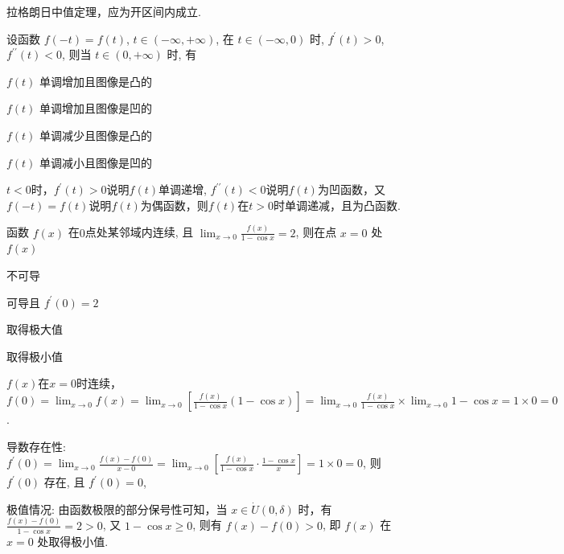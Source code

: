 \documentclass{CWNUExam}
\begin{document}
\begin{analysis}
  拉格朗日中值定理，应为开区间内成立.
\end{analysis}

\begin{problem}
  设函数 $f(-t)=f(t)$, $t \in\left(-\infty, +\infty\right)$, 在 $t \in(-\infty, 0)$ 时, $f^{\prime}(t)>0$, $f^{\prime\prime}(t)<0$, 则当 $t \in(0, +\infty)$ 时, 有
  \paren[C]
  \begin{choices}
    \item $f(t)$ 单调增加且图像是凸的
    \item $f(t)$ 单调增加且图像是凹的
    \item $f(t)$ 单调减少且图像是凸的
    \item $f(t)$ 单调减小且图像是凹的
  \end{choices}
\end{problem}

\begin{analysis}
  $t<0$时，$f^{\prime}(t)>0$说明$f(t)$单调递增, $f^{\prime\prime}(t)<0$说明$f(t)$为凹函数，又$f(-t)=f(t)$说明$f(t)$为偶函数，则$f(t)$在$t>0$时单调递减，且为凸函数.
\end{analysis}

\begin{problem}
  函数 $f(x)$ 在$0$点处某邻域内连续, 且 $\lim _{x \to 0} \frac{f(x)}{1-\cos x}=2$, 则在点 $x=0$ 处 $f(x)$
  \paren[D]
  \begin{choices}
    \item 不可导
    \item 可导且 $f^{\prime}(0)=2$
    \item 取得极大值
    \item 取得极小值
  \end{choices}
\end{problem}

\begin{analysis}
  $f(x)$在$x=0$时连续，$f(0) = \lim_{x \to 0} f(x) = \lim _{x \to 0} \left[ \frac{f(x)}{1-\cos x} \left( 1-\cos x \right) \right] = \lim _{x \to 0} \frac{f(x)}{1-\cos x} \times \lim _{x \to 0} 1-\cos x = 1 \times 0 = 0$.

  导数存在性: $f^{\prime}(0)=\lim _{x \to 0} \frac{f(x)-f(0)}{x-0}
    = \lim _{x \to 0}\left[ \frac{f(x)}{1-\cos x} \cdot \frac{1-\cos x}{x} \right]
    = 1 \times 0 = 0$, 则 $f^{\prime}(0)$ 存在, 且 $f^{\prime}(0)=0$,

  极值情况: 由函数极限的部分保号性可知，当 $x \in \dot{U}(0, \delta)$ 时，有$\frac{f(x)-f(0)}{1-\cos x} = 2>0$, 又 $1-\cos x \geqslant 0$, 则有 $f(x)-f(0)>0$, 即 $f(x)$ 在 $x=0$ 处取得极小值.
\end{analysis}
\end{document}
